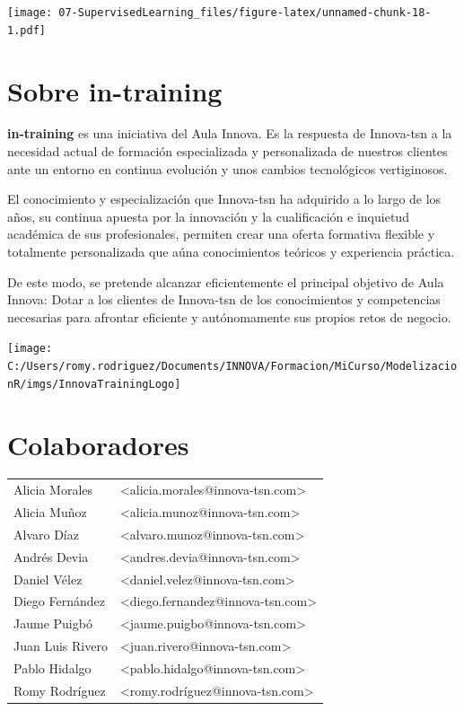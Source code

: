 \documentclass[]{book}
\begin{document}
\texttt{[image: 07-SupervisedLearning\_files/figure-latex/unnamed-chunk-18-1.pdf]}

\hypertarget{appendix-anexo}{%
\appendix}


\hypertarget{sobre-in-training}{%
\chapter{Sobre in-training}\label{sobre-in-training}}

\textbf{in-training} es una iniciativa del Aula Innova. Es la respuesta de Innova-tsn a la necesidad actual de formación especializada y personalizada de nuestros clientes ante un entorno en continua evolución y unos cambios tecnológicos vertiginosos.

El conocimiento y especialización que Innova-tsn ha adquirido a lo largo de los años, su continua apuesta por la innovación y la cualificación e inquietud académica de sus profesionales, permiten crear una oferta formativa flexible y totalmente personalizada que aúna conocimientos teóricos y experiencia práctica.

De este modo, se pretende alcanzar eficientemente el principal objetivo de Aula Innova: Dotar a los clientes de Innova-tsn de los conocimientos y competencias necesarias para afrontar eficiente y autónomamente sus propios retos de negocio.

\texttt{[image: C:/Users/romy.rodriguez/Documents/INNOVA/Formacion/MiCurso/ModelizacionR/imgs/InnovaTrainingLogo]}

\hypertarget{colaboradores}{%
\chapter{Colaboradores}\label{colaboradores}}

\begin{tabular}{ll}
\toprule
Alicia Morales & <alicia.morales@innova-tsn.com>\\
Alicia Muñoz & <alicia.munoz@innova-tsn.com>\\
Alvaro Díaz & <alvaro.munoz@innova-tsn.com>\\
Andrés Devia & <andres.devia@innova-tsn.com>\\
Daniel Vélez & <daniel.velez@innova-tsn.com>\\
\addlinespace
Diego Fernández & <diego.fernandez@innova-tsn.com>\\
Jaume Puigbó & <jaume.puigbo@innova-tsn.com>\\
Juan Luis Rivero & <juan.rivero@innova-tsn.com>\\
Pablo Hidalgo & <pablo.hidalgo@innova-tsn.com>\\
Romy Rodríguez & <romy.rodríguez@innova-tsn.com>\\
\bottomrule
\end{tabular}
\end{document}
